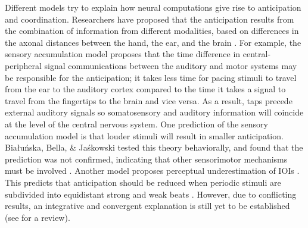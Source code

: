 \documentclass{report}
\begin{document}
Different models try to explain how neural computations give rise to anticipation and coordination. Researchers have proposed that the anticipation results from the combination of information from different modalities, based on differences in the axonal distances between the hand, the ear, and the brain \cite{aschersleben1995synchronizing, prinz1992don}. For example, the sensory accumulation model \cite{aschersleben2002temporal} proposes that the time difference in central-peripheral signal communications between the auditory and motor systems may be responsible for the anticipation; it takes less time for pacing stimuli to travel from the ear to the auditory cortex compared to the time it takes a signal to travel from the fingertips to the brain and vice versa. As a result, taps precede external auditory signals so somatosensory and auditory information will coincide at the level of the central nervous system. One prediction of the sensory accumulation model is that louder stimuli will result in smaller anticipation. Białuńska, Bella, \& Jaśkowski tested this theory behaviorally, and found that the prediction was not confirmed, indicating that other sensorimotor mechanisms must be involved \cite{bialunska2011increasing}. Another model proposes perceptual underestimation of IOIs \cite{flach2005transition}. This predicts that anticipation should be reduced when periodic stimuli are subdivided into equidistant strong and weak beats \cite{loehr2009subdividing, repp2008metrical, zendel2011effects}. However, due to conflicting results, an integrative and convergent explanation is still yet to be established (see \cite{repp2013sensorimotor} for a review).
\end{document}
